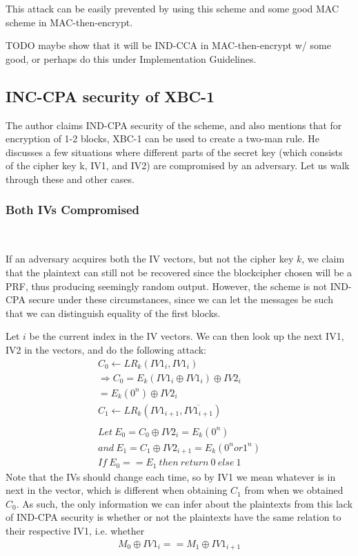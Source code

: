 \documentclass[conference]{IEEEtran}
\begin{document}
This attack can be easily prevented by using this scheme and some good MAC scheme in MAC-then-encrypt.

TODO maybe show that it will be IND-CCA in MAC-then-encrypt w/ some good, or perhaps do this under Implementation Guidelines.

\subsection{INC-CPA security of XBC-1}

The author claims IND-CPA security of the scheme, and also mentions that for encryption of 1-2 blocks, XBC-1 can be used to create a two-man rule. He discusses a few situations where different parts of the secret key (which consists of the cipher key k, IV1, and IV2) are compromised by an adversary. Let us walk through these and other cases. \\

\subsubsection{Both IVs Compromised} \

If an adversary acquires both the IV vectors, but not the cipher key $k$, we claim that the plaintext can still not be recovered since the blockcipher chosen will be a PRF, thus producing seemingly random output. However, the scheme is not IND-CPA secure under these circumstances, since we can let the messages be such that we can distinguish equality of the first blocks.

Let $i$ be the current index in the IV vectors. We can then look up the next IV1, IV2 in the vectors, and do the following attack:
\begin{gather*}
  C_0 \leftarrow LR_k(IV1_i, IV1_i) \\
  \Rightarrow C_0=E_k(IV1_i \oplus IV1_i) \oplus IV2_i \\
  = E_k(0^n) \oplus IV2_i \\
  C_1 \leftarrow LR_k(IV1_{i+1}, \overline{IV1_{i+1}}) \\ \\
  Let\ E_0=C_0 \oplus IV2_i=E_k(0^n) \\
  and\ E_1=C_1 \oplus IV2_{i+1}=E_k(0^n or 1^n) \\
  If\ E_0==E_1\ then\ return\ 0\ else\ 1
\end{gather*}
Note that the IVs should change each time, so by IV1 we mean whatever is in next in the vector, which is different when obtaining $C_1$ from when we obtained $C_0$. As such, the only information we can infer about the plaintexts from this lack of IND-CPA security is whether or not the plaintexts have the same relation to their respective IV1, i.e. whether
\begin{gather*}
  M_0 \oplus IV1_i == M_1 \oplus IV1_{i+1}
\end{gather*}
\end{document}
